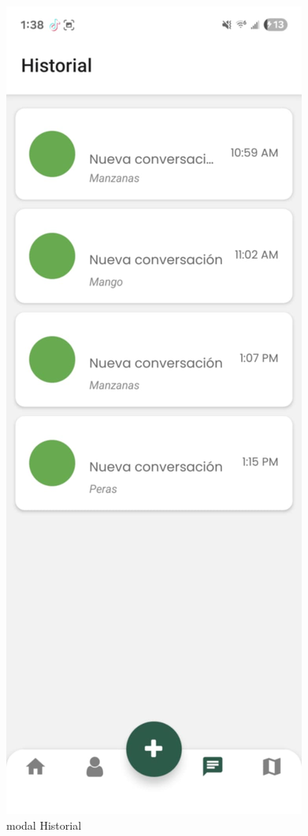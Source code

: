 \documentclass[11pt, a4paper, oneside]{book}
\begin{document}
\begin{figure}[H]
\centering
\includegraphics[width=0.3  4\textwidth]{Pictures/2.png}
         \caption{modal Historial}
\end{figure}
\end{document}
